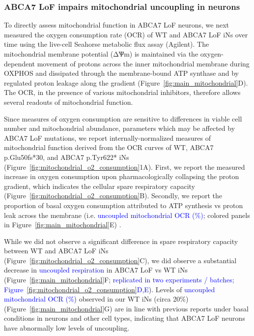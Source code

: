 \subsubsection{ABCA7 LoF impairs mitochondrial uncoupling in neurons}
To directly assess mitochondrial function in ABCA7 LoF neurons, we next measured the oxygen consumption rate (OCR) of WT and ABCA7 LoF iNs over time using the live-cell Seahorse metabolic flux assay (Agilent). The mitochondrial membrane potential (ΔѰm) is maintained via the oxygen-dependent movement of protons across the inner mitochondrial membrane during OXPHOS and dissipated through the membrane-bound ATP synthase and by regulated proton leakage along the gradient (Figure~\ref{fig:main_mitochondrial}D). The OCR, in the presence of various mitochondrial inhibitors, therefore allows several readouts of mitochondrial function\cite{Divakaruni2014-eq}.

Since measures of oxygen consumption are sensitive to differences in viable cell number and mitochondrial abundance\cite{Divakaruni2014-eq,Gu2021-ms}, parameters which may be affected by ABCA7 LoF mutations, we report internally-normalized measures of mitochondrial function derived from the OCR curves\cite{Divakaruni2022-rj} of WT, ABCA7 p.Glu50fs*30, and ABCA7 p.Tyr622* iNs (Figure~\ref{fig:mitochondrial_o2_consumption}1A).  First, we  report the measured increase in oxygen consumption upon pharmacologically collapsing the proton gradient, which indicates the cellular spare respiratory capacity \cite{Divakaruni2022-rj}(Figure~\ref{fig:mitochondrial_o2_consumption}B).  Secondly, we report the proportion of basal oxygen consumption attributed to ATP synthesis vs proton leak across the membrane  (i.e. \textcolor{blue}{uncoupled mitochondrial OCR (\%)}; colored panels in Figure~\ref{fig:main_mitochondrial}E) \cite{Divakaruni2014-eq}. 

While we did not observe a significant difference in spare respiratory capacity between WT and ABCA7 LoF iNs (Figure~\ref{fig:mitochondrial_o2_consumption}C), we did observe a substantial decrease in \textcolor{blue}{uncoupled respiration} in ABCA7 LoF vs WT iNs (Figure~\ref{fig:main_mitochondrial}F; \textcolor{blue}{replicated in two experiments / batches; Figure~\ref{fig:mitochondrial_o2_consumption}D,E}). Levels of \textcolor{blue}{uncoupled mitochondrial OCR (\%)} observed in our WT iNs (circa 20\%) (Figure~\ref{fig:main_mitochondrial}G) are in line with previous reports under basal conditions in neurons and other cell types\cite{Divakaruni2011-uj,Jekabsons2004-fn}, indicating that ABCA7 LoF neurons have abnormally low levels of uncoupling. 

